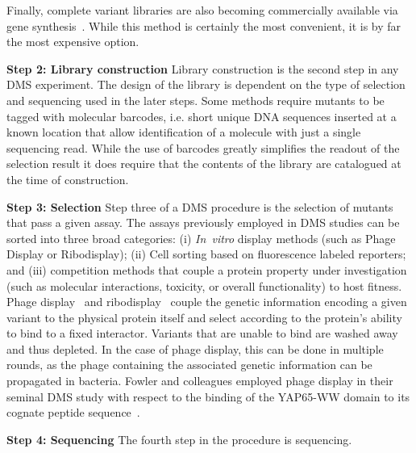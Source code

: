 Finally, complete variant libraries are also becoming commercially available via gene synthesis~\cite{kosuri_scalable_2010}. While this method is certainly the most convenient, it is by far the most expensive option. 

\textbf{Step 2: Library construction} Library construction is the second step in any DMS experiment. 
The design of the library is dependent on the type of selection and sequencing used in the later steps. Some methods require mutants to be tagged with molecular barcodes, i.e. short unique DNA sequences inserted at a known location that allow identification of a molecule with just a single sequencing read. While the use of barcodes greatly simplifies the readout of the selection result it does require that the contents of the library are catalogued at the time of construction.

\textbf{Step 3: Selection} Step three of a DMS procedure is the selection of mutants that pass a given assay. The assays previously employed in DMS studies can be sorted into three broad categories: (i) \textit{In~vitro} display methods (such as Phage Display or Ribodisplay); (ii) Cell sorting based on fluorescence labeled reporters; and (iii) competition methods that couple a protein property under investigation (such as molecular interactions, toxicity, or overall functionality) to host fitness. 
Phage display~ and ribodisplay~ couple the genetic information encoding a given variant to the physical protein itself and select according to the protein's ability to bind to a fixed interactor. Variants that are unable to bind are washed away and thus depleted. In the case of phage display, this can be done in multiple rounds, as the phage containing the associated genetic information can be propagated in bacteria. Fowler and colleagues employed phage display in their seminal DMS study with respect to the binding of the YAP65-WW domain to its cognate peptide sequence~\cite{fowler_high-resolution_2010}.


\textbf{Step 4: Sequencing} The fourth step in the procedure is sequencing. 



